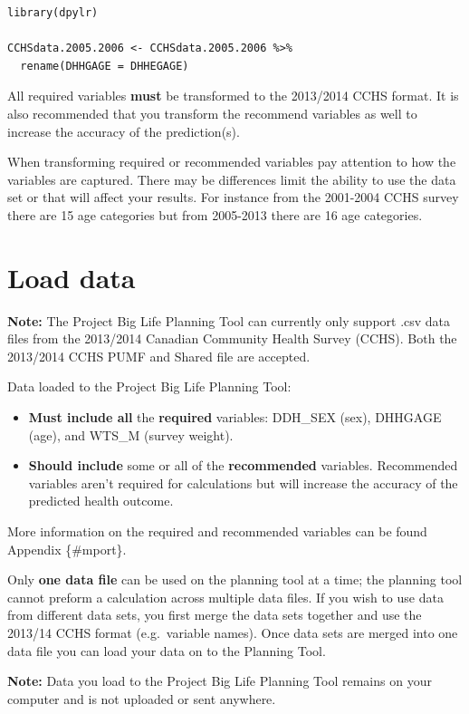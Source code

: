 \documentclass[]{book}
\begin{document}
\begin{verbatim}
library(dpylr)

CCHSdata.2005.2006 <- CCHSdata.2005.2006 %>% 
  rename(DHHGAGE = DHHEGAGE)
\end{verbatim}

All required variables \textbf{must} be transformed to the 2013/2014
CCHS format. It is also recommended that you transform the recommend
variables as well to increase the accuracy of the prediction(s).

When transforming required or recommended variables pay attention to how
the variables are captured. There may be differences limit the ability
to use the data set or that will affect your results. For instance from
the 2001-2004 CCHS survey there are 15 age categories but from 2005-2013
there are 16 age categories.

\section{Load data}\label{load-data}

\textbf{Note:} The Project Big Life Planning Tool can currently only
support .csv data files from the 2013/2014 Canadian Community Health
Survey (CCHS). Both the 2013/2014 CCHS PUMF and Shared file are
accepted.

Data loaded to the Project Big Life Planning Tool:

\begin{itemize}
\item
  \textbf{Must include all} the \textbf{required} variables: DDH\_SEX
  (sex), DHHGAGE (age), and WTS\_M (survey weight).
\item
  \textbf{Should include} some or all of the \textbf{recommended}
  variables. Recommended variables aren't required for calculations but
  will increase the accuracy of the predicted health outcome.
\end{itemize}

More information on the required and recommended variables can be found
Appendix \{\#mport\}.

Only \textbf{one data file} can be used on the planning tool at a time;
the planning tool cannot preform a calculation across multiple data
files. If you wish to use data from different data sets, you first merge
the data sets together and use the 2013/14 CCHS format (e.g.~variable
names). Once data sets are merged into one data file you can load your
data on to the Planning Tool.

\textbf{Note:} Data you load to the Project Big Life Planning Tool
remains on your computer and is not uploaded or sent anywhere.
\end{document}

